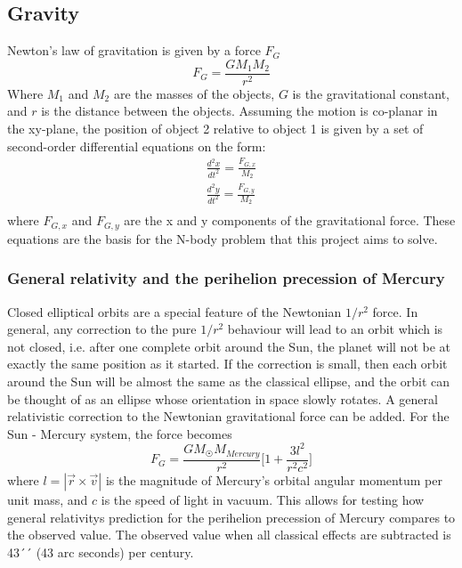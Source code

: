 \subsection{Gravity}
Newton's law of gravitation is given by a force $F_G$
\begin{equation}\label{eq:grav}
F_G = \frac{GM_1M_2}{r^2}
\end{equation}
Where $M_1$ and $M_2$ are the masses of the objects, $G$ is the gravitational constant, and $r$ 
is the distance between the objects.
Assuming the motion is co-planar in the xy-plane, the position of object 2 relative to  
object 1 is given by a set of second-order differential equations on the form:
\begin{align*}
\frac{d^2x}{dt^2} = \frac{F_{G,x}}{M_2} \\
\frac{d^2y}{dt^2} = \frac{F_{G,y}}{M_2} \\
\end{align*}
where $F_{G,x}$ and $F_{G,y}$ are the x and y components of the gravitational force.
These equations are the basis for the N-body problem that this project aims to solve.

\subsubsection{General relativity and the perihelion precession of Mercury}\label{sec:prec}
Closed elliptical orbits are a special feature of the Newtonian $1/r^2$ force. In
general, any correction to the pure $1/r^2$ behaviour will lead to an orbit which is
not closed, i.e. after one complete orbit around the Sun, the planet will not be
at exactly the same position as it started. If the correction is small, then each
orbit around the Sun will be almost the same as the classical ellipse, and the
orbit can be thought of as an ellipse whose orientation in space slowly rotates.
A general relativistic correction to the Newtonian gravitational force can be added. For the 
Sun - Mercury system, the force becomes
\begin{equation*}
F_G = \frac{GM_{\astrosun}M_{Mercury}}{r^2}\bigg[1+\frac{3l^2}{r^2c^2}\bigg]
\end{equation*}
where $l = |\vec{r} \times \vec{v}|$ is the magnitude of Mercury's orbital angular momentum per unit
mass, and $c$ is the speed of light in vacuum.
This allows for testing how general relativitys prediction for the perihelion precession of Mercury
compares to the observed value. The observed value when all classical effects are subtracted is 43´´
(43 arc seconds) per century.
